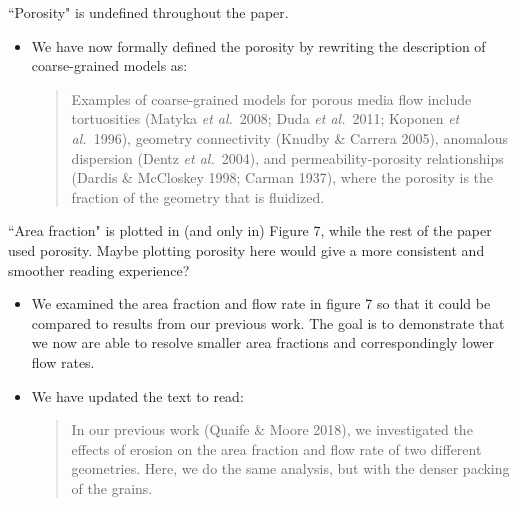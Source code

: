 \documentclass[11pt]{article}
\newcommand{\comment}[1]{{\color{blue} #1}}
\begin{document}
\noindent
\comment{``Porosity" is undefined throughout the paper.}
\begin{itemize}
  \item We have now formally defined the porosity by rewriting the
    description of coarse-grained models as:
  \begin{quotation}
  \noindent
    Examples of coarse-grained models for porous media flow include
    tortuosities (Matyka {\em et al.}~2008; Duda {\em et al.}~2011;
    Koponen {\em et al.}~1996), geometry connectivity (Knudby \& Carrera
    2005), anomalous dispersion (Dentz {\em et al.}~2004), and
    permeability-porosity relationships (Dardis \& McCloskey 1998;
    Carman 1937), where the porosity is the fraction of the geometry
    that is fluidized.
  \end{quotation}


\end{itemize}

\noindent
\comment{``Area fraction" is plotted in (and only in) Figure 7, while
the rest of the paper used porosity. Maybe plotting porosity here would
give a more consistent and smoother reading experience?}
\begin{itemize}
  \item We examined the area fraction and flow rate in figure 7 so that
    it could be compared to results from our previous work. The goal is
    to demonstrate that we now are able to resolve smaller area
    fractions and correspondingly lower flow rates.

  \item We have updated the text to read:
    \begin{quotation}
      \noindent
      In our previous work (Quaife \& Moore 2018), we investigated the
      effects of erosion on the area fraction and flow rate of two
      different geometries. Here, we do the same analysis, but with the
      denser packing of the grains.
    \end{quotation}

\end{itemize}
\end{document}
